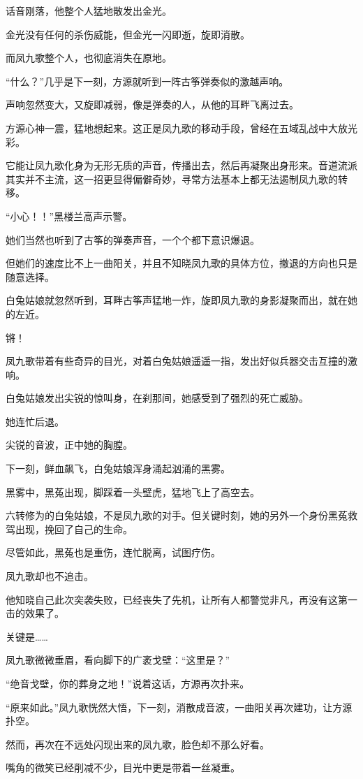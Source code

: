 \begin{this_body}
话音刚落，他整个人猛地散发出金光。

金光没有任何的杀伤威能，但金光一闪即逝，旋即消散。

而凤九歌整个人，也彻底消失在原地。

“什么？”几乎是下一刻，方源就听到一阵古筝弹奏似的激越声响。

声响忽然变大，又旋即减弱，像是弹奏的人，从他的耳畔飞离过去。

方源心神一震，猛地想起来。这正是凤九歌的移动手段，曾经在五域乱战中大放光彩。

它能让凤九歌化身为无形无质的声音，传播出去，然后再凝聚出身形来。音道流派其实并不主流，这一招更显得偏僻奇妙，寻常方法基本上都无法遏制凤九歌的转移。

“小心！！”黑楼兰高声示警。

她们当然也听到了古筝的弹奏声音，一个个都下意识爆退。

但她们的速度比不上一曲阳关，并且不知晓凤九歌的具体方位，撤退的方向也只是随意选择。

白兔姑娘就忽然听到，耳畔古筝声猛地一炸，旋即凤九歌的身影凝聚而出，就在她的左近。

锵！

凤九歌带着有些奇异的目光，对着白兔姑娘遥遥一指，发出好似兵器交击互撞的激响。

白兔姑娘发出尖锐的惊叫身，在刹那间，她感受到了强烈的死亡威胁。

她连忙后退。

尖锐的音波，正中她的胸膛。

下一刻，鲜血飙飞，白兔姑娘浑身涌起汹涌的黑雾。

黑雾中，黑菟出现，脚踩着一头壁虎，猛地飞上了高空去。

六转修为的白兔姑娘，不是凤九歌的对手。但关键时刻，她的另外一个身份黑菟救驾出现，挽回了自己的生命。

尽管如此，黑菟也是重伤，连忙脱离，试图疗伤。

凤九歌却也不追击。

他知晓自己此次突袭失败，已经丧失了先机，让所有人都警觉非凡，再没有这第一击的效果了。

关键是……

凤九歌微微垂眉，看向脚下的广袤戈壁：“这里是？”

“绝音戈壁，你的葬身之地！”说着这话，方源再次扑来。

“原来如此。”凤九歌恍然大悟，下一刻，消散成音波，一曲阳关再次建功，让方源扑空。

然而，再次在不远处闪现出来的凤九歌，脸色却不那么好看。

嘴角的微笑已经削减不少，目光中更是带着一丝凝重。


\end{this_body}
